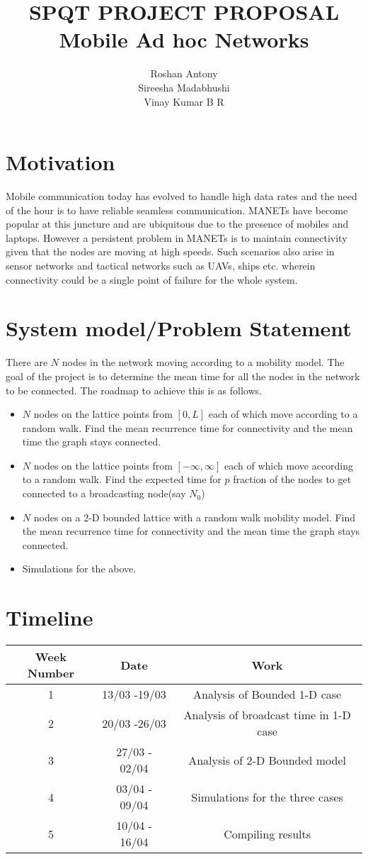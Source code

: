 \documentclass[a4paper,10pt,english]{article}
\title{\textbf{SPQT PROJECT PROPOSAL}\\ Mobile Ad hoc Networks}
\author{Roshan Antony \\ Sireesha Madabhushi \\ Vinay Kumar B R}
\begin{document}
\maketitle
\section{Motivation}
\par Mobile communication today has evolved to handle high data rates and the need of the hour is to have reliable seamless communication. MANETs have become popular at this juncture and are ubiquitous due to the presence of mobiles and laptops. However a persistent problem in MANETs is to maintain connectivity given that the nodes are moving at high speeds. Such scenarios also arise in sensor networks and tactical networks such as UAVs, ships etc. wherein connectivity could be a single point of failure for the whole system.

\section{System model/Problem Statement}
There are $N$ nodes in the network moving according to a mobility model. The goal of the project is to determine the mean time for all the nodes in the network to be connected. The roadmap to achieve this is as follows.
\begin{itemize}
\item $N$ nodes on the lattice points from $[0,L]$ each of which move according to a random walk. Find the mean recurrence time for connectivity and the mean time the graph stays connected.
\item $N$ nodes on the lattice points from $[-\infty,\infty]$ each of which move according to a random walk. Find the expected time for $p$ fraction of the nodes to get connected to a broadcasting node(say $N_0$)
\item $N$ nodes on a 2-D bounded lattice with a random walk mobility model. Find the mean recurrence time for connectivity and the mean time the graph stays connected.
\item Simulations for the above.
\end{itemize}

\section{Timeline}
\begin{center}
\begin{tabular}{|c|c|c|}
\hline
Week Number & Date & Work \\ \hline
1 & 13/03 -19/03 & Analysis of Bounded 1-D case \\ \hline
2 & 20/03 -26/03 & Analysis of broadcast time in 1-D case \\ \hline
3 & 27/03 - 02/04 & Analysis of 2-D Bounded model \\ \hline
4 & 03/04 - 09/04 & Simulations for the three cases \\ \hline
5 & 10/04 - 16/04 & Compiling results \\ \hline
\end{tabular}
\end{center}
\end{document}
